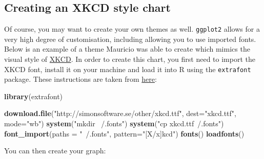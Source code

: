 \documentclass[]{article}
\newenvironment{Shaded}{\begin{snugshade}}{\end{snugshade}}
\newcommand{\KeywordTok}[1]{\textcolor[rgb]{0.13,0.29,0.53}{\textbf{{#1}}}}
\newcommand{\DataTypeTok}[1]{\textcolor[rgb]{0.13,0.29,0.53}{{#1}}}
\newcommand{\StringTok}[1]{\textcolor[rgb]{0.31,0.60,0.02}{{#1}}}
\newcommand{\NormalTok}[1]{{#1}}
\begin{document}
\subsection{Creating an XKCD style
chart}\label{creating-an-xkcd-style-chart-5}

Of course, you may want to create your own themes as well.
\texttt{ggplot2} allows for a very high degree of customisation,
including allowing you to use imported fonts. Below is an example of a
theme Mauricio was able to create which mimics the visual style of
\href{http://xkcd.com/}{XKCD}. In order to create this chart, you first
need to import the XKCD font, install it on your machine and load it
into R using the \texttt{extrafont} package. These instructions are
taken from
\href{https://www.google.com.au/url?sa=t\&rct=j\&q=\&esrc=s\&source=web\&cd=1\&ved=0ahUKEwiWzafchdPJAhVBpJQKHe_LDT8QFggbMAA\&url=https\%3A\%2F\%2Fcran.r-project.org\%2Fweb\%2Fpackages\%2Fxkcd\%2Fvignettes\%2Fxkcd-intro.pdf\&usg=AFQjCNE-KciGY14e-Q1buYIVmTFC0ht__Q\&sig2=DZUwkvIHwfNWtTtkcz94jg}{here}:

\begin{Shaded}
\begin{Highlighting}[]
\KeywordTok{library}\NormalTok{(extrafont)}

\KeywordTok{download.file}\NormalTok{(}\StringTok{"http://simonsoftware.se/other/xkcd.ttf"}\NormalTok{, }
\DataTypeTok{dest=}\StringTok{"xkcd.ttf"}\NormalTok{, }\DataTypeTok{mode=}\StringTok{"wb"}\NormalTok{)}
\KeywordTok{system}\NormalTok{(}\StringTok{"mkdir ~/.fonts"}\NormalTok{)}
\KeywordTok{system}\NormalTok{(}\StringTok{"cp xkcd.ttf~/.fonts"}\NormalTok{)}
\KeywordTok{font_import}\NormalTok{(}\DataTypeTok{paths =} \StringTok{"~/.fonts"}\NormalTok{, }\DataTypeTok{pattern=}\StringTok{"[X/x]kcd"}\NormalTok{)}
\KeywordTok{fonts}\NormalTok{()}
\KeywordTok{loadfonts}\NormalTok{()}
\end{Highlighting}
\end{Shaded}

You can then create your graph:
\end{document}
